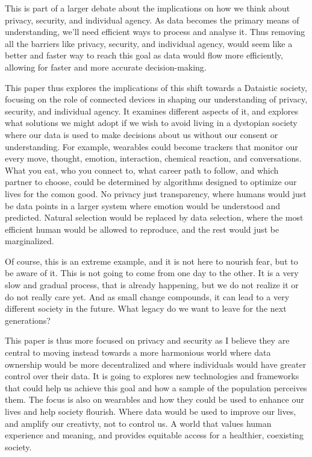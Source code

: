This is part of a larger debate about the implications on how we think about privacy, security, and individual agency. As data becomes the primary means of understanding, we'll need efficient ways to process and analyse it. Thus removing all the barriers like privacy, security, and individual agency, would seem like a better and faster way to reach this goal as data would flow more efficiently, allowing for faster and more accurate decision-making. 

This paper thus explores the implications of this shift towards a Dataistic society, focusing on the role of connected devices in shaping our understanding of privacy, security, and individual agency. It examines different aspects of it, and explores what solutions we might adopt if we wish to avoid living in a dystopian society where our data is used to make decisions about us without our consent or understanding. For example, wearables could become trackers that monitor our every move, thought, emotion, interaction, chemical reaction, and conversations. What you eat, who you connect to, what career path to follow, and which partner to choose, could be determined by algorithms designed to optimize our lives for the comon good. No privacy just transparency, where humans would just be data points in a larger system where emotion would be understood and predicted. Natural selection would be replaced by data selection, where the most efficient human would be allowed to reproduce, and the rest would just be marginalized.

Of course, this is an extreme example, and it is not here to nourish fear, but to be aware of it. This is not going to come from one day to the other. It is a very slow and gradual process, that is already happening, but we do not realize it or do not really care yet. And as small change compounds, it can lead to a very different society in the future. What legacy do we want to leave for the next generations? 

This paper is thus more focused on privacy and security as I believe they are central to moving instead towards a more harmonious world where data ownership would be more decentralized and where individuals would have greater control over their data. It is going to explores new technologies and frameworks that could help us achieve this goal and how a sample of the population perceives them. The focus is also on wearables and how they could be used to enhance our lives and help society flourish. Where data would be used to improve our lives, and amplify our creativty, not to control us. A world that values human experience and meaning, and provides equitable access for a healthier, coexisting society.

